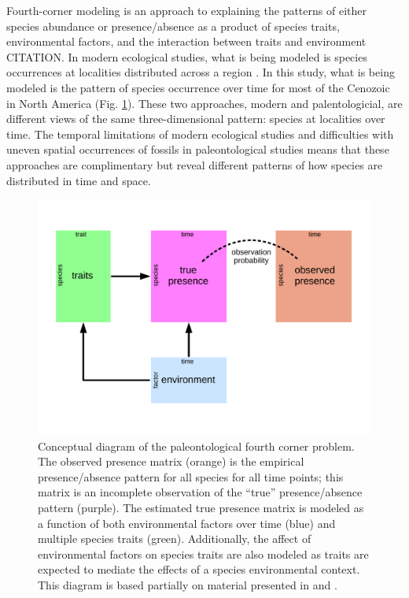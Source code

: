 \documentclass[12pt,letterpaper]{article}
\begin{document}
Fourth-corner modeling is an approach to explaining the patterns of either species abundance or presence/absence as a product of species traits, environmental factors, and the interaction between traits and environment \citep{Brown2014c,Warton2015a,Pollock2012,Jamil2013} CITATION. In modern ecological studies, what is being modeled is species occurrences at localities distributed across a region \citep{Pollock2012,Jamil2013}. In this study, what is being modeled is the pattern of species occurrence over time for most of the Cenozoic in North America (Fig. \ref{fig:concept_fourth_corner}). These two approaches, modern and palentologicial, are different views of the same three-dimensional pattern: species at localities over time. The temporal limitations of modern ecological studies and difficulties with uneven spatial occurrences of fossils in paleontological studies means that these approaches are complimentary but reveal different patterns of how species are distributed in time and space.

\begin{figure}[ht]
  \centering
  \includegraphics[width=\textwidth,height=0.5\textheight,keepaspectratio=true]{figure/paleo_fourth_corner}
  \caption[Conceptual diagram of the paleontological fourth-courner problem]{Conceptual diagram of the paleontological fourth corner problem. The observed presence matrix (orange) is the empirical presence/absence pattern for all species for all time points; this matrix is an incomplete observation of the ``true'' presence/absence pattern (purple). The estimated true presence matrix is modeled as a function of both environmental factors over time (blue) and multiple species traits (green). Additionally, the affect of environmental factors on species traits are also modeled as traits are expected to mediate the effects of a species environmental context. This diagram is based partially on material presented in \citet{Brown2014c} and \citet{Warton2015a}.}
  \label{fig:concept_fourth_corner}
\end{figure}
\end{document}
